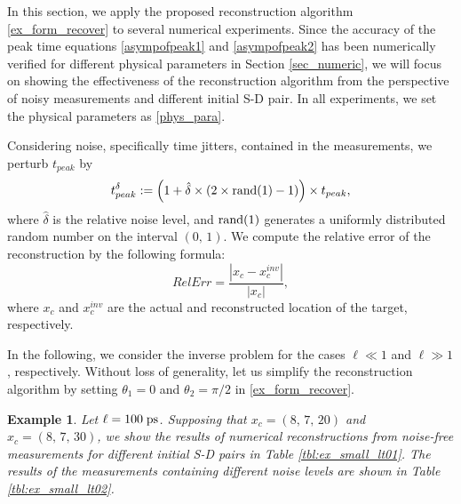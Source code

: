 \documentclass[10pt]{article}
\newtheorem{example}[theorem]{Example}
\numberwithin{equation}{section}
\numberwithin{figure}{section}
\begin{document}
In this section, we apply the proposed reconstruction algorithm \eqref{ex_form_recover} to several numerical experiments. Since the accuracy of the peak time equations \eqref{asympofpeak1} and \eqref{asympofpeak2} has been numerically verified for different physical parameters in Section \ref{sec_numeric}, we will focus on showing the effectiveness of the reconstruction algorithm from the perspective of noisy measurements and different initial S-D pair.
In all experiments, we set the physical parameters as \eqref{phys_para}.  

Considering noise, specifically time jitters, contained in the measurements, we perturb $t_{peak}$ by
\begin{equation}\label{noisydata_add}
t_{peak}^\delta:=\left(1+\hat\delta\times(2\times {\rm rand(1)} -1)\right)\times t_{peak},
\end{equation}
where $\hat\delta$ is the relative noise level, and $\rm rand(1)$ generates a uniformly distributed random number on the interval $(0,\,1)$.
We compute the relative error of the reconstruction by the following formula:
\begin{equation}\label{equ_relerr_xc}
RelErr=\frac{|x_c-x_c^{inv}|}{|x_c|},
\end{equation}
where $x_c$ and $x_c^{inv}$ are the actual and reconstructed location of the target, respectively.

In the following, we consider the inverse problem for the cases $\ell\ll 1$ and $\ell\gg 1$, respectively. Without loss of generality, let us simplify the reconstruction algorithm by setting $\theta_1=0$ and $\theta_2=\pi/2$ in \eqref{ex_form_recover}.

\begin{example}
    Let $\ell=100 \; {\rm ps}$. Supposing that  $x_c=(8,\,7,\,20)$ and $x_c=(8,\,7,\,30)$, we show the results of numerical reconstructions from noise-free measurements for different initial S-D pairs in Table \ref{tbl:ex_small_lt01}. The results of the measurements containing different noise levels are shown in Table \ref{tbl:ex_small_lt02}. 
\end{example}
\end{document}
